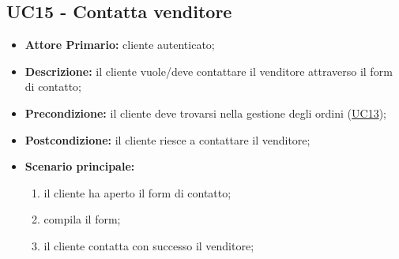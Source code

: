 \subsection{UC15 - Contatta venditore} 
\label{UC15}
\begin{itemize}
    \item \textbf{Attore Primario:} cliente autenticato;
    \item \textbf{Descrizione:} il cliente vuole/deve contattare il venditore attraverso il form di contatto;
    \item \textbf{Precondizione:} il cliente deve trovarsi nella gestione degli ordini (\hyperref[UC13]{UC13});
    \item \textbf{Postcondizione:} il cliente riesce a contattare il venditore;
    \item \textbf{Scenario principale:}
    \begin{enumerate}
        \item il cliente ha aperto il form di contatto;
        \item compila il form;
        \item il cliente contatta con successo il venditore;
    \end{enumerate}
\end{itemize}